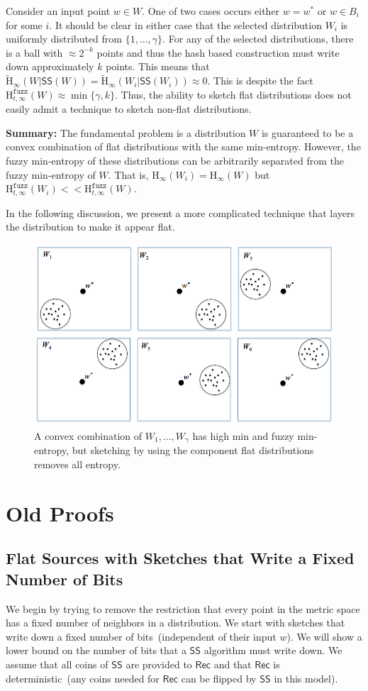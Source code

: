 \documentclass[11pt]{article}
\newcommand{\class}[1]{{\ensuremath{\mathsf{#1}}}}
\newcommand{\sketch}{\ensuremath{\class{SS}}\xspace}
\newcommand{\rec}{\ensuremath{\class{Rec}}\xspace}
\newcommand{\Hoo}{\mathrm{H}_\infty}
\newcommand{\Hav}{\tilde{\mathrm{H}}_\infty}
\newcommand{\Hfuzz}{\mathrm{H}^{\mathtt{fuzz}}_{t,\infty}}
\begin{document}
Consider an input point $w\in W$.  One of two cases occurs either $w=w^*$ or $w\in B_i$ for some $i$.  It should be clear in either case that the selected distribution $W_i$ is uniformly distributed from $\{1,..., \gamma\}$.  For any of the selected distributions, there is a ball with $\approx 2^{-k}$ points and thus the hash based construction must write down approximately $k$ points.  This means that $\Hav(W | \sketch(W))  = \Hav(W_i | \sketch(W_i)) \approx 0$.  This is despite the fact $\Hfuzz(W) \approx \min\{\gamma, k\}$.  Thus, the ability to sketch flat distributions does not easily admit a technique to sketch non-flat distributions.  

\textbf{Summary:} The fundamental problem is a distribution $W$ is guaranteed to be a convex combination of flat distributions with the same min-entropy.  However, the fuzzy min-entropy of these distributions can be arbitrarily separated from the fuzzy min-entropy of $W$.  That is, $\Hoo(W_i) = \Hoo(W)$ but $\Hfuzz(W_i) << \Hfuzz(W)$.

In the following discussion, we present a more complicated technique that layers the distribution to make it appear flat.

\begin{figure}[t]

\centering
    \includegraphics[width=.9\textwidth]{convexCombExample.png}
    \caption{A convex combination of $W_1,..., W_\gamma$ has high min and fuzzy min-entropy, but sketching by using the component flat distributions removes all entropy.}
\label{fig:convex comb}    
\end{figure}


\section{Old Proofs}
\subsection{Flat Sources with Sketches that Write a Fixed Number of Bits}
We begin by trying to remove the restriction that every point in the metric space has a fixed number of neighbors in a distribution.  We start with sketches that write down a fixed number of bits~(independent of their input $w$).   We will show a lower bound on the number of bits that a $\sketch$ algorithm must write down.  We assume that all coins of $\sketch$ are provided to $\rec$ and that $\rec$ is deterministic~(any coins needed for $\rec$ can be flipped by $\sketch$ in this model).
\end{document}

